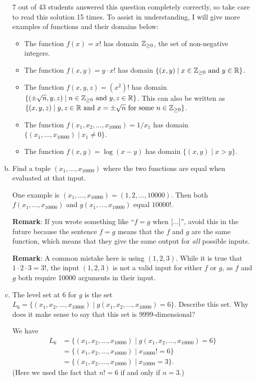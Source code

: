\begin{problem}
\begin{enumerate}[(a)]
\begin{solution}
      7 out of 43 students answered this question completely correctly, so take care to read this solution 15 times. To assist in understanding, I will give more examples of functions and their domains below:
      \begin{itemize}
        \item The function $f(x)=x!$ has domain $\mathbb Z_{\geq 0}$, the set of non-negative integers.
        \item The function $f(x,y)=y\cdot x!$ has domain $\{(x,y)\mid x\in\mathbb Z_{\geq 0}\text{ and }y\in\mathbb R\}$.
        \item The function $f(x,y,z)=(x^2)!$ has domain $\{(\pm\sqrt n,y,z)\mid n\in\mathbb Z_{\geq 0}\text{ and }y,z\in\mathbb R\}$. This can also be written as $\{(x,y,z)\mid y,z\in\mathbb R\text{ and }x=\pm\sqrt n\text{ for some }n\in\mathbb Z_{\geq 0}\}$.
        \item The function $f(x_1,x_2,\dots,x_{10000})=1/x_1$ has domain $\{(x_1,\dots,x_{10000})\mid x_1\neq 0\}$.
        \item The function $f(x,y)=\log(x-y)$ has domain $\{(x,y)\mid x>y\}$.
      \end{itemize}
    \end{solution}
    \item Find a tuple $(x_1,\dots,x_{10000})$ where the two functions are equal when evaluated at that input.
    \begin{solution}
      One example is $(x_1,\dots,x_{10000})=(1,2,\dots,10000)$. Then both $f(x_1,\dots,x_{10000})$ and $g(x_1,\dots,x_{10000})$ equal $10000!$.

      \textbf{Remark}: If you wrote something like ``$f=g$ when [...]'', avoid this in the future because the sentence $f=g$ means that the $f$ and $g$ are the same function, which means that they give the same output for \emph{all} possible inputs.

      \textbf{Remark}: A common mistake here is using $(1,2,3)$. While it is true that $1\cdot 2\cdot 3=3!$, the input $(1,2,3)$ is not a valid input for either $f$ or $g$, as $f$ and $g$ both require 10000 arguments in their input.
    \end{solution}
    \item The level set at $6$ for $g$ is the set $L_6=\{(x_1,x_2,\dots,x_{10000})\mid g(x_1,x_2,\dots,x_{10000})=6\}$. Describe this set. Why does it make sense to say that this set is 9999-dimensional?
    \begin{solution}
      We have
      \[\begin{split}
        L_6 &= \{(x_1,x_2,\dots,x_{10000})\mid g(x_1,x_2,\dots,x_{10000})=6\}\\
        &= \{(x_1,x_2,\dots,x_{10000})\mid x_{10000}! =6\}\\
        &= \{(x_1,x_2,\dots,x_{10000})\mid x_{10000} =3\}.
      \end{split}\]
      (Here we used the fact that $n!=6$ if and only if $n=3$.)


\end{solution}
\end{enumerate}
\end{problem}
